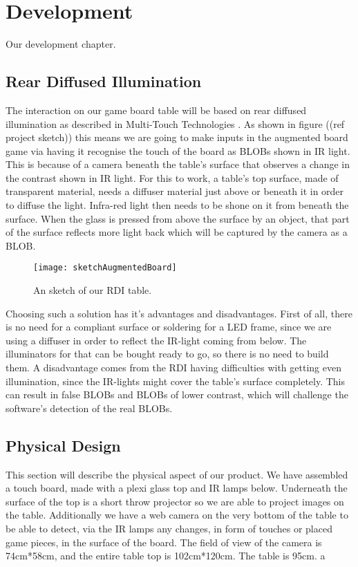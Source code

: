\chapter{Development}\label{ch:development}
Our development chapter. 

\section{Rear Diffused Illumination}
The interaction on our game board table will be based on rear diffused illumination as described in Multi-Touch Technologies \citep{multiTT}. As shown in figure ((ref project sketch)) this means we are going to make inputs in the augmented board game via having it recognise the touch of the board as BLOBs shown in IR light. This is because of a camera beneath the table's surface that observes a change in the contrast shown in IR light. 
For this to work, a table's top surface, made of transparent material, needs a diffuser material just above or beneath it in order to diffuse the light. Infra-red light then needs to be shone on it from beneath the surface. When the glass is pressed from above the surface by an object, that part of the surface reflects more light back which will be captured by the camera as a BLOB.
\begin{figure}[!h]
\centering	\texttt{[image: sketchAugmentedBoard]}
\label{Figure 5.1} \caption{An sketch of our RDI table.}
\end{figure}

Choosing such a solution has it's advantages and disadvantages. First of all, there is no need for a compliant surface or soldering for a LED frame, since we are using a diffuser in order to reflect the IR-light coming from below. The illuminators for that can be bought ready to go, so there is no need to build them. A disadvantage comes from the RDI having difficulties with getting even illumination, since the IR-lights might cover the table's surface completely. This can result in false BLOBs and BLOBs of lower contrast, which will challenge the software's detection of the real BLOBs.

\section{Physical Design} 
This section will describe the physical aspect of our product.
We have assembled a touch board, made with a plexi glass top and IR lamps below. Underneath the surface of the top is a short throw projector so we are able to project images on the table. Additionally we have a web camera on the very bottom of the table to be able to detect, via the IR lamps any changes, in form of touches or placed game pieces, in the surface of the board. 
The field of view of the camera is 74cm*58cm, and the entire table top is 102cm*120cm. The table is 95cm. 
a


